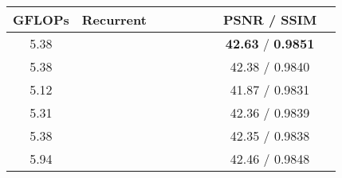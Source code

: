 \documentclass[final]{cvpr}
\begin{document}
    \begin{table*}[ht!]
        \centering
        \small
        \setlength{\tabcolsep}{2pt}
        \begin{subtable}{\columnwidth}
            \centering          
            \begin{tabular}{ccccccccc}
                \hline
                GFLOPs&   Recurrent    &   &  &   &  && PSNR / SSIM \\
                \hline      \hline  
                \rowcolor{LightYellow}
                5.38&  &   &  &  &   &  & \textbf{42.63} / \textbf{0.9851 } \\
                5.38&  &   &  &  &   &  & 42.38 / 0.9840 \\
                
                5.12&  &       &  &  &   &  & 41.87 / 0.9831 \\
                5.31&  &   &      &  &   &  & 42.36 / 0.9839 \\
                5.38&  &   &  &      &   &  & 42.35 / 0.9838 \\
                5.94&  &   &  &  &       &  & 42.46 / 0.9848 \\
                

\end{tabular}
\end{subtable}
\end{table*}
\end{document}

